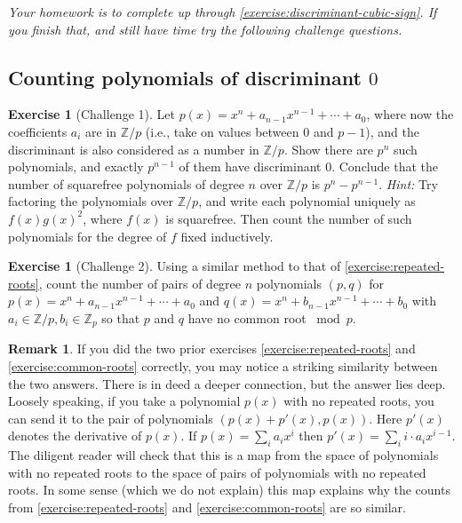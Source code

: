 \documentclass[reqno, 12pt, letter]{article}
\theoremstyle{plain}
\theoremstyle{definition}
\newtheorem{remark}[theorem]{Remark}
\newtheorem{exercise}[theorem]{Exercise}
\theoremstyle{remark}
\numberwithin{equation}{section}
\newcommand\bz{{\mathbb Z}}
\begin{document}

{\it Your homework is to complete up through \autoref{exercise:discriminant-cubic-sign}. If you finish that, and still have time try the following challenge questions.}

\subsection{Counting polynomials of discriminant $0$}
\begin{exercise}[Challenge 1]
	\label{exercise:repeated-roots}
	Let $p(x) = x^n + a_{n-1}x^{n-1} + \cdots + a_0$, where now the coefficients $a_i$ are
	in $\bz/p$ (i.e., take on values between $0$ and $p-1$), and the discriminant is
	also considered as a number in $\bz/p$. Show there are $p^n$ such polynomials, and exactly
	$p^{n-1}$ of them have discriminant $0$.
	Conclude that the number of squarefree polynomials of degree $n$ over $\bz/p$ is $p^n - p^{n-1}$.
	{\it Hint:} Try factoring the polynomials over $\bz/p$, and write each polynomial
	uniquely as $f(x)g(x)^2$, where $f(x)$ is squarefree. Then count the number
	of such polynomials for the degree of $f$ fixed inductively.	
\end{exercise}

\begin{exercise}[Challenge 2]
	\label{exercise:common-roots}
	Using a similar method to that of \autoref{exercise:repeated-roots},
	count the number of pairs of degree $n$ polynomials $(p,q)$ for 
	$p(x) = x^n + a_{n-1}x^{n-1} + \cdots + a_0$ and $q(x) = x^n + b_{n-1}x^{n-1} + \cdots + b_0$
	with $a_i \in \bz/p, b_i \in \bz_p$ so that $p$ and $q$ have no common root $\bmod p$.
\end{exercise}
\begin{remark}
	\label{remark:}
	If you did the two prior exercises \autoref{exercise:repeated-roots} and \autoref{exercise:common-roots} correctly, you may notice a striking similarity
between the two answers. There is in deed a deeper connection, but the answer lies deep.
Loosely speaking, if you take a polynomial $p(x)$ with no repeated roots, you can send it
to the pair of polynomials $(p(x) + p'(x), p(x))$. Here $p'(x)$ denotes the derivative of $p(x)$.
If $p(x) = \sum_i a_ix^i$ then $p'(x) = \sum_i  i \cdot a_i x^{i-1}$.
The diligent reader will check that this is a map from the space of polynomials with no repeated roots to the
space of pairs of polynomials with no repeated roots.
In some sense (which we do not explain) this map explains why the counts from 
\autoref{exercise:repeated-roots} and \autoref{exercise:common-roots} are so similar.
\end{remark}
\end{document}
